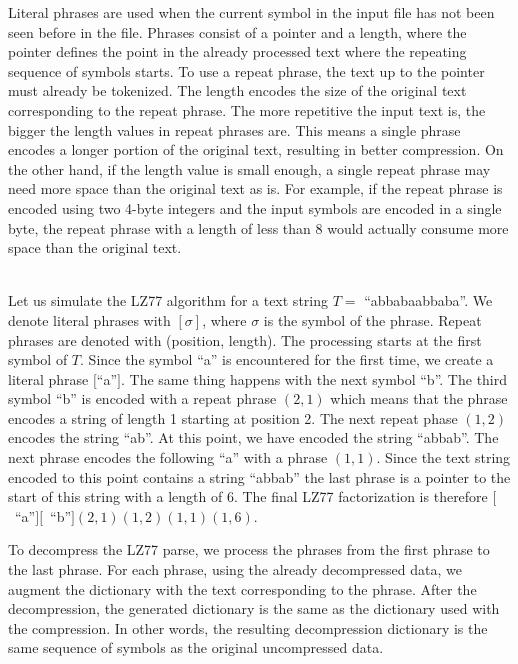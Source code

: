 \documentclass[english,twoside,censored,csm,algorithms-track-2020]{HYthesisML}
\theoremstyle{plain}
\theoremstyle{definition}
\begin{document}
Literal phrases are used when the current symbol in the input file has not been seen before in the file.
Phrases consist of a pointer and a length, where the pointer defines the point in the already
processed text where the repeating sequence of symbols starts. To use a repeat phrase, the text up
to the pointer must already be tokenized.
The length encodes the size of the original text
corresponding to the repeat phrase. The more repetitive the input text is, the bigger the length
values in repeat phrases are. This means a single phrase encodes a longer portion of the original
text, resulting in better compression. On the other hand, if the length value is small enough,
a single repeat phrase may need more space than the original text as is. For example,
if the repeat phrase is encoded using two 4-byte integers and the input symbols are encoded in a
single byte, the repeat phrase with a length of less than 8 would actually
consume more space than the original text.

\begin{testexample}\\
  Let us simulate the LZ77 algorithm for a text string $T=$ ``abbabaabbaba''. We denote literal phrases
  with $[\sigma]$, where $\sigma$ is the symbol of the phrase. Repeat phrases are denoted
  with (position, length). The processing starts
  at the first symbol of $T$. Since the symbol ``a'' is encountered for the first time, we create a
  literal phrase $[$``a''$]$. The same thing happens with the next symbol ``b''. The third symbol ``b'' is
  encoded with a repeat phrase $(2,1)$ which means that the phrase encodes a string of length 1 starting
  at position 2. The next repeat phase $(1,2)$ encodes the string ``ab''. At this point, we have encoded
  the string ``abbab''. The next phrase encodes the following ``a'' with a phrase $(1,1)$. Since
  the text string encoded to this point contains a string ``abbab'' the last phrase is a pointer
  to the start of this string with a length of 6. The final LZ77 factorization is therefore
  \hbox{$[$ ``a''$][$ ``b''$](2,1)(1,2)(1,1)(1,6)$.}
\end{testexample}

To decompress the LZ77 parse, we process the phrases from the first phrase to the last phrase. For each
phrase, using the already decompressed data, we augment the dictionary with the text corresponding
to the phrase. After the decompression, the generated dictionary is the same as the dictionary used
with the compression. In other words, the resulting decompression dictionary is the same sequence
of symbols as the original uncompressed data. 
\end{document}

